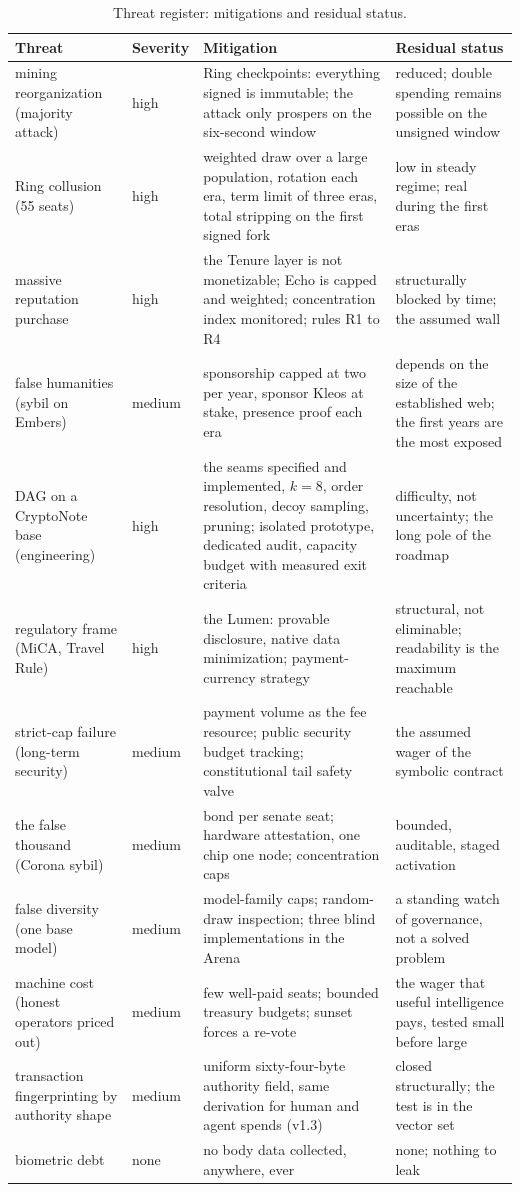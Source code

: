 \begin{table}[htbp]
\centering
\small
\caption{Threat register: mitigations and residual status.}
\label{tab:threats}
\begin{tabularx}{\textwidth}{@{}L{3.4cm}L{1.5cm}YY@{}}
\toprule
Threat & Severity & Mitigation & Residual status \\
\midrule
mining reorganization (majority attack) & high & Ring checkpoints: everything signed is immutable; the attack only prospers on the six-second window & reduced; double spending remains possible on the unsigned window \\
Ring collusion (55 seats) & high & weighted draw over a large population, rotation each era, term limit of three eras, total stripping on the first signed fork & low in steady regime; real during the first eras \\
massive reputation purchase & high & the Tenure layer is not monetizable; Echo is capped and weighted; concentration index monitored; rules R1 to R4 & structurally blocked by time; the assumed wall \\
false humanities (sybil on Embers) & medium & sponsorship capped at two per year, sponsor Kleos at stake, presence proof each era & depends on the size of the established web; the first years are the most exposed \\
DAG on a CryptoNote base (engineering) & high & the seams specified and implemented, $k = 8$, order resolution, decoy sampling, pruning; isolated prototype, dedicated audit, capacity budget with measured exit criteria & difficulty, not uncertainty; the long pole of the roadmap \\
regulatory frame (MiCA, Travel Rule) & high & the Lumen: provable disclosure, native data minimization; payment-currency strategy & structural, not eliminable; readability is the maximum reachable \\
strict-cap failure (long-term security) & medium & payment volume as the fee resource; public security budget tracking; constitutional tail safety valve & the assumed wager of the symbolic contract \\
the false thousand (Corona sybil) & medium & bond per senate seat; hardware attestation, one chip one node; concentration caps & bounded, auditable, staged activation \\
false diversity (one base model) & medium & model-family caps; random-draw inspection; three blind implementations in the Arena & a standing watch of governance, not a solved problem \\
machine cost (honest operators priced out) & medium & few well-paid seats; bounded treasury budgets; sunset forces a re-vote & the wager that useful intelligence pays, tested small before large \\
transaction fingerprinting by authority shape & medium & uniform sixty-four-byte authority field, same derivation for human and agent spends (v1.3) & closed structurally; the test is in the vector set \\
biometric debt & none & no body data collected, anywhere, ever & none; nothing to leak \\
\bottomrule
\end{tabularx}
\end{table}

